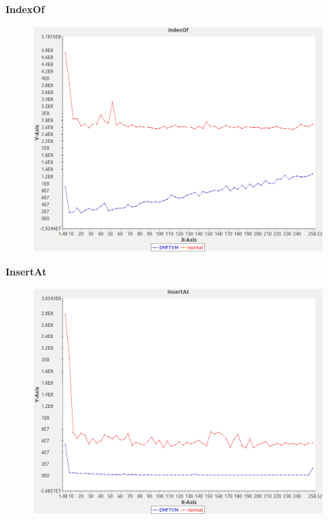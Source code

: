 \noindent\textbf{IndexOf}

\begin{figure}[h]
\centering
\includegraphics[width=\textwidth]{graphs/orderedset/IndexOf}
\end{figure}
\pagebreak

\noindent\textbf{InsertAt}

\begin{figure}[h]
\centering
\includegraphics[width=\textwidth]{graphs/orderedset/InsertAt}
\end{figure}
\pagebreak

